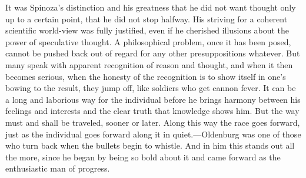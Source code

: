 \documentclass[12pt]{book}
\newcommand{\opage}[1]{\marginnote{\footnotesize\textit{[#1]}}}
\begin{document}
\opage{50}It was Spinoza's distinction and his greatness that he did not want thought
only up to a certain point, that he did not stop halfway. His striving for a coherent
scientific world-view was fully justified, even if he cherished illusions about the
power of speculative thought. A philosophical problem, once it has been posed, cannot
be pushed back out of regard for any other presuppositions whatever. But many speak with
apparent recognition of reason and thought, and when it then becomes serious, when the
honesty of the recognition is to show itself in one's bowing to the result, they jump
off, like soldiers who get cannon fever. It can be a long and laborious way for the
individual before he brings harmony between his feelings and interests and the clear
truth that knowledge shows him. But the way must and shall be traveled, sooner or later.
Along this way the race goes forward, just as the individual goes forward along it in
quiet.---Oldenburg was one of those who turn back when the bullets begin to whistle.
And in him this stands out all the more, since he began by being so bold about it and
came forward as the enthusiastic man of progress.
\end{document}
